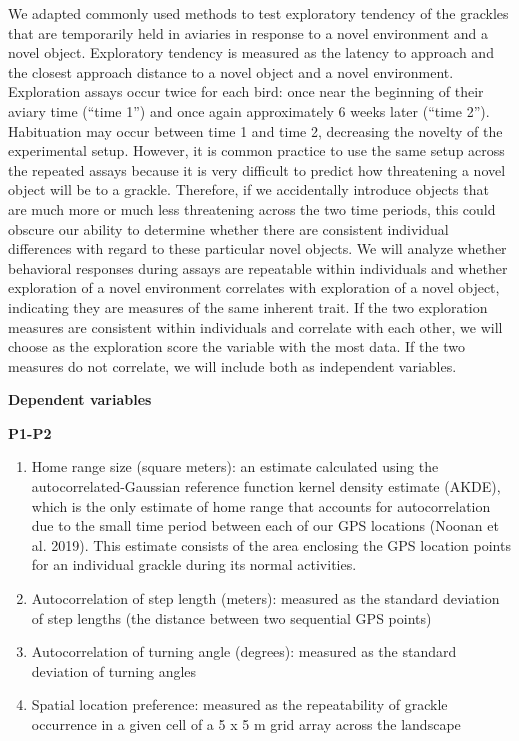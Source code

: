 \documentclass[
]{article}
\begin{document}
We adapted commonly used methods to test exploratory tendency of the
grackles that are temporarily held in aviaries in response to a novel
environment and a novel object. Exploratory tendency is measured as the
latency to approach and the closest approach distance to a novel object
and a novel environment. Exploration assays occur twice for each bird:
once near the beginning of their aviary time (``time 1'') and once again
approximately 6 weeks later (``time 2''). Habituation may occur between
time 1 and time 2, decreasing the novelty of the experimental setup.
However, it is common practice to use the same setup across the repeated
assays because it is very difficult to predict how threatening a novel
object will be to a grackle. Therefore, if we accidentally introduce
objects that are much more or much less threatening across the two time
periods, this could obscure our ability to determine whether there are
consistent individual differences with regard to these particular novel
objects. We will analyze whether behavioral responses during assays are
repeatable within individuals and whether exploration of a novel
environment correlates with exploration of a novel object, indicating
they are measures of the same inherent trait. If the two exploration
measures are consistent within individuals and correlate with each
other, we will choose as the exploration score the variable with the
most data. If the two measures do not correlate, we will include both as
independent variables.

\textbf{Dependent variables}

\textbf{P1-P2}

\begin{enumerate}
\def\labelenumi{\arabic{enumi})}
\item
  Home range size (square meters): an estimate calculated using the
  autocorrelated-Gaussian reference function kernel density estimate
  (AKDE), which is the only estimate of home range that accounts for
  autocorrelation due to the small time period between each of our GPS
  locations (Noonan et al. 2019). This estimate consists of the area
  enclosing the GPS location points for an individual grackle during its
  normal activities.
\item
  Autocorrelation of step length (meters): measured as the standard
  deviation of step lengths (the distance between two sequential GPS
  points)
\item
  Autocorrelation of turning angle (degrees): measured as the standard
  deviation of turning angles
\item
  Spatial location preference: measured as the repeatability of grackle
  occurrence in a given cell of a 5 x 5 m grid array across the
  landscape
\end{enumerate}
\end{document}
